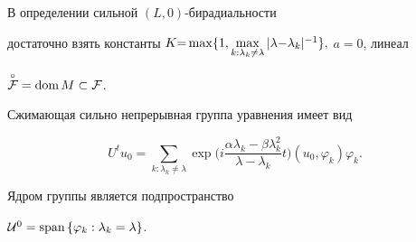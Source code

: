 В определении сильной $(L,0)$-бирадиальности


достаточно взять константы $K{=}\max\{1,\linebreak \max\limits_{k:


\lambda_k\ne\lambda}|\lambda{-}\lambda_k|^{{-}1}\},$ $a=0$, линеал


$\overset{\circ}{{\cal F}}{}=\operatorname{dom} M\subset {\cal F}$.





Сжимающая сильно непрерывная группа уравнения имеет вид


$$


U^tu_0=


\sum_{k:\lambda _k\ne\lambda }\exp\bigg (i\frac{\alpha\lambda _k-


\beta\lambda _k^2}{\lambda -\lambda _k}t\bigg)(u_0,\varphi _k)\varphi _k.


$$


Ядром группы является подпространство


${\cal U}^0=\text{span\,}\{\varphi_k:\lambda_k=\lambda\}$.








